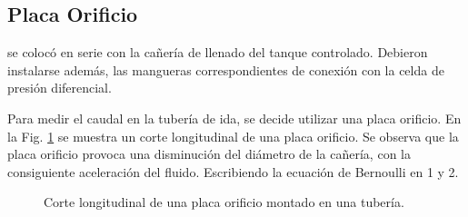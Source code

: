 \subsection{Placa Orificio}
\label{subsec:PlacaOrificio}
  se colocó en serie con la cañería de llenado del tanque controlado.
  Debieron instalarse además, las mangueras correspondientes de conexión 
  con la celda de presión diferencial.

Para medir el caudal en la tubería de ida, se decide
utilizar una placa orificio.
En la Fig. \ref{fig:placaOrificio} se muestra un corte longitudinal de una placa
orificio.
Se observa que la placa orificio provoca una disminución del diámetro
de la cañería, con la consiguiente aceleración del fluido.
Escribiendo la ecuación de Bernoulli en 1 y 2.

\begin{figure}
 \centering
 \caption{Corte longitudinal de una placa orificio montado en una tubería.}
 \label{fig:placaOrificio}
\end{figure}

